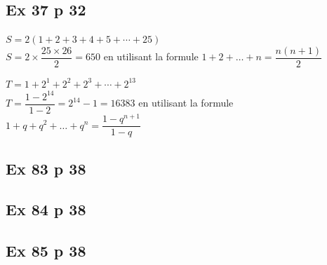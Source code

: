 \documentclass[a4paper,french]{book}
\begin{document}
\subsection*{Ex 37 p 32}
\begin{enumMet}
    \item $S=2(1+2+3+4+5+\cdots+25)$ \\
    $S=2 \times \dfrac{25 \times 26}{2}=650$ en utilisant la formule $1+2+\ldots+n=\dfrac{n(n+1)}{2}$
    \item $T=1+2^{1}+2^{2}+2^{3}+\cdots+2^{13}$\\
    $T=\dfrac{1-2^{14}}{1-2}=2^{14}-1=16383$ en utilisant la formule
    $1+q+q^{2}+\ldots+q^{n}=\dfrac{1-q^{n+1}}{1-q}$
\end{enumMet}

\subsection*{Ex 83 p 38}
\begin{enumMet}
    \item 
\end{enumMet}

\subsection*{Ex 84 p 38}
\begin{enumMet}
    \item 
\end{enumMet}

\subsection*{Ex 85 p 38}
\begin{enumMet}
    \item 
\end{enumMet}
\end{document}
